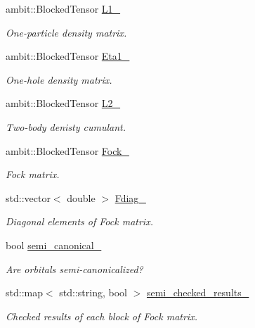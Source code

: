 \begin{DoxyCompactItemize}
ambit\+::\+Blocked\+Tensor \mbox{\hyperlink{classforte_1_1_s_a_d_s_r_g_a1c38b6783a2f14b7a4eb0f6086ea5815}{L1\+\_\+}}
\begin{DoxyCompactList}\small\item\em One-\/particle density matrix. \end{DoxyCompactList}\item 
ambit\+::\+Blocked\+Tensor \mbox{\hyperlink{classforte_1_1_s_a_d_s_r_g_a2472ecdfc5bfbd64c48dfdbe03408972}{Eta1\+\_\+}}
\begin{DoxyCompactList}\small\item\em One-\/hole density matrix. \end{DoxyCompactList}\item 
ambit\+::\+Blocked\+Tensor \mbox{\hyperlink{classforte_1_1_s_a_d_s_r_g_a9f5ddef0072f5d78809e269152f44a16}{L2\+\_\+}}
\begin{DoxyCompactList}\small\item\em Two-\/body denisty cumulant. \end{DoxyCompactList}\item 
ambit\+::\+Blocked\+Tensor \mbox{\hyperlink{classforte_1_1_s_a_d_s_r_g_af1cba6f56cec884d2b4715360be36b5d}{Fock\+\_\+}}
\begin{DoxyCompactList}\small\item\em Fock matrix. \end{DoxyCompactList}\item 
std\+::vector$<$ double $>$ \mbox{\hyperlink{classforte_1_1_s_a_d_s_r_g_a993f721c41e96e77a2e4f400d041e129}{Fdiag\+\_\+}}
\begin{DoxyCompactList}\small\item\em Diagonal elements of Fock matrix. \end{DoxyCompactList}\item 
bool \mbox{\hyperlink{classforte_1_1_s_a_d_s_r_g_a8dfc4d98f7619c56aa0f744825ac74fc}{semi\+\_\+canonical\+\_\+}}
\begin{DoxyCompactList}\small\item\em Are orbitals semi-\/canonicalized? \end{DoxyCompactList}\item 
std\+::map$<$ std\+::string, bool $>$ \mbox{\hyperlink{classforte_1_1_s_a_d_s_r_g_a468917e7d1c9de3c93502ef9c5b0fdb1}{semi\+\_\+checked\+\_\+results\+\_\+}}
\begin{DoxyCompactList}\small\item\em Checked results of each block of Fock matrix. \end{DoxyCompactList}\item 

\end{DoxyCompactItemize}
